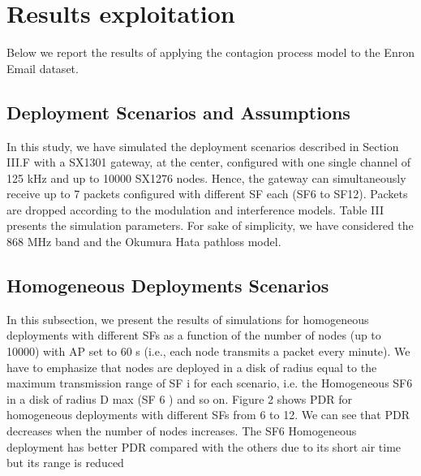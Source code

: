 \section{Results exploitation} \label{sec:Results exploitation}

Below we report the results of applying the contagion process model to the Enron Email dataset.

\subsection{Deployment Scenarios and Assumptions}
In this study,
	we have simulated the deployment scenarios described in Section III.F with a SX1301 gateway,
	at the center,
	configured with one single channel of 125 kHz and up to 10000 SX1276 nodes.
Hence,
	the gateway can simultaneously receive up to 7 packets configured with different SF each (SF6 to SF12).
Packets are dropped according to the modulation and interference models.
Table III presents the simulation parameters.
For sake of simplicity,
	we have considered the 868 MHz band and the Okumura Hata pathloss model.
	
\subsection{Homogeneous Deployments Scenarios}

In this subsection,
	we present the results of simulations for homogeneous deployments with different SFs as a function of the number of nodes (up to 10000) with AP set to 60 s (i.e.,
	each node transmits a packet every minute).
We have to emphasize that nodes are deployed in a disk of radius equal to the maximum transmission range of SF i for each scenario,
	i.e.
the Homogeneous SF6 in a disk of radius D max (SF 6 ) and so on.
Figure 2 shows PDR for homogeneous deployments with different SFs from 6 to 12.
We can see that PDR decreases when the number of nodes increases.
The SF6 Homogeneous deployment has better PDR compared with the others due to its short air time but its range is reduced


